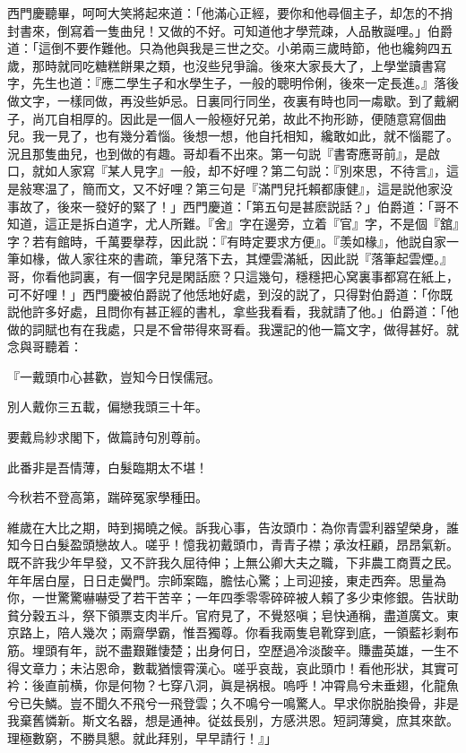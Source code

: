 西門慶聽畢，呵呵大笑將起來道：「他滿心正經，要你和他尋個主子，却怎的不捎封書來，倒寫着一隻曲兒！又做的不好。可知道他才學荒疎，人品散誕哩。」伯爵道：「這倒不要作難他。只為他與我是三世之交。小弟兩三歲時節，他也纔夠四五歲，那時就同吃糖糕餅果之類，也沒些兒爭論。後來大家長大了，上學堂讀書寫字，先生也道：『應二學生子和水學生子，一般的聰明伶俐，後來一定長進。』落後做文字，一樣同做，再没些妒忌。日裏同行同坐，夜裏有時也同一䖏歇。到了戴網子，尚兀自相厚的。因此是一個人一般極好兄弟，故此不拘形跡，便随意寫個曲兒。我一見了，也有幾分着惱。後想一想，他自托相知，纔敢如此，就不惱罷了。況且那隻曲兒，也到做的有趣。哥却看不出來。第一句説『書寄應哥前』，是啟口，就如人家寫『某人見字』一般，却不好哩？第二句説：『別來思，不待言』，這是敍寒温了，簡而文，又不好哩？第三句是『滿門兒托賴都康健』，這是説他家没事故了，後來一發好的緊了！」西門慶道：「第五句是甚麽説話？」伯爵道：「哥不知道，這正是拆白道字，尤人所難。『舍』字在邊旁，立着『官』字，不是個『舘』字？若有館時，千萬要擧荐，因此説：『有時定要求方便』。『羡如椽』，他説自家一筆如椽，做人家往來的書疏，筆兒落下去，其煙雲滿紙，因此説『落筆起雲煙。』哥，你看他詞裏，有一個字兒是閑話麽？只這幾句，穩穩把心窝裏事都寫在紙上，可不好哩！」西門慶被伯爵説了他恁地好處，到沒的説了，只得對伯爵道：「你既説他許多好處，且問你有甚正經的書札，拿些我看看，我就請了他。」伯爵道：「他做的詞賦也有在我處，只是不曾带得來哥看。我還記的他一篇文字，做得甚好。就念與哥聽着：

『一戴頭巾心甚歡，豈知今日悮儒冠。

別人戴你三五載，偏戀我頭三十年。

要戴烏紗求閣下，做篇詩句別尊前。

此番非是吾情薄，白髮臨期太不堪！

今秋若不登高第，踹碎冤家學種田。

維歲在大比之期，時到揭曉之候。訴我心事，告汝頭巾：為你青雲利器望榮身，誰知今日白髮盈頭戀故人。嗟乎！憶我初戴頭巾，青青子襟；承汝枉顧，昂昂氣新。既不許我少年早發，又不許我久屈待伸；上無公卿大夫之職，下非農工商賈之民。年年居白屋，日日走黌門。宗師案臨，膽怯心驚；上司迎接，東走西奔。思量為你，一世驚驚嚇嚇受了若干苦辛；一年四季零零碎碎被人賴了多少束修銀。告狀助貧分穀五斗，祭下領票支肉半斤。官府見了，不覺怒嗔；皂快通稱，盡道廣文。東京路上，陪人幾次；兩齋學霸，惟吾獨尊。你看我兩隻皂靴穿到底，一領藍衫剩布筋。埋頭有年，説不盡艱難悽楚；出身何日，空歷過冷淡酸辛。賺盡英雄，一生不得文章力；未沾恩命，數載猶懷霄漢心。嗟乎哀哉，哀此頭巾！看他形狀，其實可衿：後直前横，你是何物？七穿八洞，眞是祸根。嗚呼！冲霄鳥兮未垂翅，化龍魚兮已失鱗。豈不聞久不飛兮一飛登雲；久不鳴兮一鳴驚人。早求你脱胎換骨，非是我棄舊憐新。斯文名器，想是通神。従兹長别，方感洪恩。短詞薄奠，庶其來歆。理極數窮，不勝具懇。就此拜别，早早請行！』」

